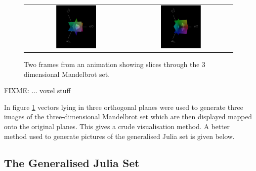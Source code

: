 \begin{figure}
\centering
\begin{tabular}{c@{$\quad$}c}
\includegraphics[width=0.4\textwidth]{3dmandel1}
 & \includegraphics[width=0.4\textwidth]{3dmandel2} 
\end{tabular}
\caption{\label{fig:3dmandel}
  Two frames from an animation\cite{FRAC:MandelAnim} showing slices through
          the 3 dimensional Mandelbrot set.}
\end{figure}

FIXME: ... voxel stuff


In figure \ref{fig:3dmandel} vectors lying in three orthogonal
planes were used to generate three images of the three-dimensional
Mandelbrot set which are then displayed mapped onto the original planes. This
gives a crude visualisation method. A better method used to generate pictures
of the generalised Julia set is given below.

\subsection{The Generalised Julia Set}

